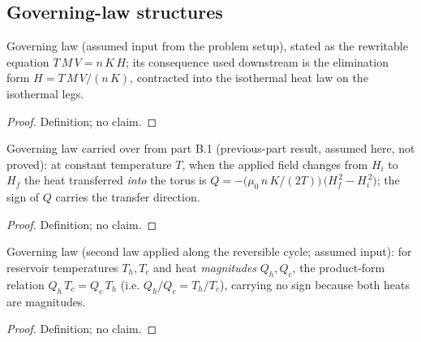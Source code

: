 \subsection*{Governing-law structures}

\begin{definition}
\label{def:IPhO2026Problems_problem_IPhO_2026_3_C_2:EquationOfStateParamagnet}
Governing law (assumed input from the problem setup), stated as the
rewritable equation $T\,M\,V = n\,K\,H$; its consequence used
downstream is the elimination form $H = T\,M\,V/(n\,K)$, contracted
into the isothermal heat law on the isothermal legs.
\end{definition}
\begin{proof}
Definition; no claim.
\end{proof}

\begin{definition}
\label{def:IPhO2026Problems_problem_IPhO_2026_3_C_2:IsothermalHeatIntoTorus}
Governing law carried over from part B.1 (previous-part result,
assumed here, not proved): at constant temperature $T$, when the
applied field changes from $H_i$ to $H_f$ the heat transferred
\emph{into} the torus is
$Q = -\bigl(\mu_0\,n\,K/(2T)\bigr)\,\bigl(H_f^{\,2} - H_i^{\,2}\bigr)$;
the sign of $Q$ carries the transfer direction.
\end{definition}
\begin{proof}
Definition; no claim.
\end{proof}

\begin{definition}
\label{def:IPhO2026Problems_problem_IPhO_2026_3_C_2:CarnotHeatRatio}
Governing law (second law applied along the reversible cycle; assumed
input): for reservoir temperatures $T_h, T_c$ and heat
\emph{magnitudes} $Q_h, Q_c$, the product-form relation
$Q_h\,T_c = Q_c\,T_h$ (i.e. $Q_h/Q_c = T_h/T_c$), carrying no sign
because both heats are magnitudes.
\end{definition}
\begin{proof}
Definition; no claim.
\end{proof}

